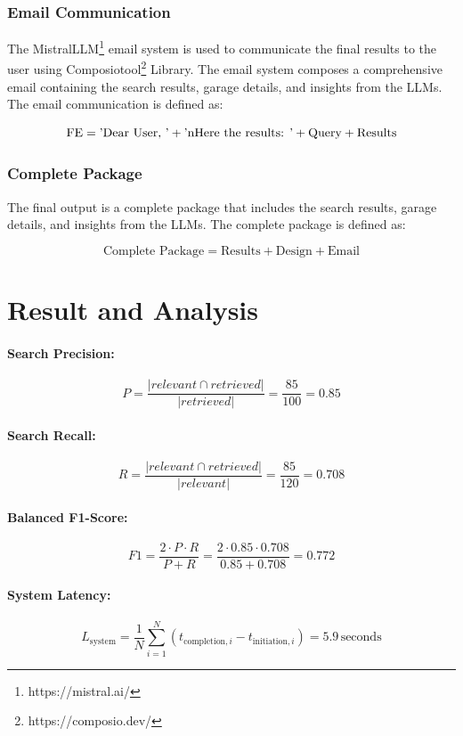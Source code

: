 \documentclass[conference]{IEEEtran}
\begin{document}
\subsubsection{Email Communication}
The MistralLLM\footnote{https://mistral.ai/} email system is used to communicate the final results to the user using Composiotool\footnote{https://composio.dev/} Library. The email system composes a comprehensive email containing the search results, garage details, and insights from the LLMs. The email communication is defined as:

\[
\text{FE} = \text{'Dear User, '} + \text{'\\nHere  the results: '} + \text{Query}  + \text{Results}
\]

\subsubsection{Complete Package}
The final output is a complete package that includes the search results, garage details, and insights from the LLMs. The complete package is defined as:

\[
\text{Complete Package} = \text{Results} + \text{Design} + \text{Email}
\]

\section{Result and Analysis}

\paragraph{Search Precision:}
\[
P = \frac{|{relevant} \cap {retrieved}|}{|{retrieved}|} = \frac{85}{100} = 0.85
\]

\paragraph{Search Recall:}
\[
R = \frac{|{relevant} \cap {retrieved}|}{|{relevant}|} = \frac{85}{120} = 0.708
\]

\paragraph{Balanced F1-Score:}
\[
F1 = \frac{2 \cdot P \cdot R}{P + R} = \frac{2 \cdot 0.85 \cdot 0.708}{0.85 + 0.708} = 0.772
\]

\paragraph{System Latency:}
\[
L_{\text{system}} = \frac{1}{N} \sum_{i=1}^N (t_{\text{completion},i} - t_{\text{initiation},i}) = 5.9 \, \text{seconds}
\]
\end{document}
